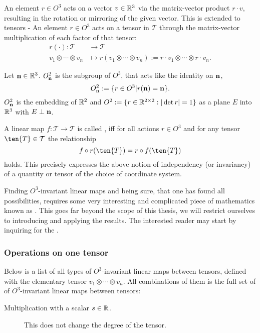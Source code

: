 {\begin{definition}
	An element $r\in O^3$ acts on a vector $v\in\mathbb{R}^3$ via the matrix-vector product $r\cdot v$, resulting in the rotation or mirroring of the given vector. This is extended to tensors - An element $r\in O^3$ acts on a tensor in $\mathcal{T}$ through the matrix-vector multiplication of each factor of that tensor:
	\begin{align*}
		r(\cdot):\mathcal{T} &\to \mathcal{T}\\
		v_1 \otimes \cdots \otimes v_n&\mapsto r(v_1 \otimes \cdots \otimes v_n) :=r\cdot v_1 \otimes \cdots \otimes r\cdot v_n.
	\end{align*}
\end{definition}

\begin{definition}
	Let $\mathbf{n}\in \mathbb{R}^3$. $O^2_{\mathbf{n}}$ is the subgroup of $O^3$, that acts like the identity on $\mathbf{n}$,  \[O^2_{\mathbf{n}}:=\{r\in O^3 | r(\mathbf{n}) = \mathbf{n} \}.\] 
	$O^2_{\mathbf{n}}$  is the embedding of $\mathbb{R}^2$ and $O^2:= \{r\in\mathbb{R}^{2\times 2}: |\det r| = 1\}$ as a plane $E$ into $\mathbb{R}^3$ with $E\perp\mathbf{n}$.
\end{definition}


\begin{definition}
	A linear map $f: \mathcal{T}\to \mathcal{T}$ is called , iff for all actions $r\in O^3$  and for any tensor $\ten{T}\in\mathcal{T}$ the relationship
	\[f \circ r (\ten{T}) = r \circ f (\ten{T})\]
	holds. This precisely expresses the above notion of independency (or invariancy) of a quantity or tensor of the choice of coordinate system.
\end{definition}
Finding $O^3$-invariant linear maps and being sure, that one has found all possibilities, requires some very interesting and complicated piece of mathematics known as . This goes far beyond the scope of this thesis, we will restrict ourselves to introducing and applying the results. The interested reader may start by inquiring for the . 

\subsubsection{Operations on one tensor}\label{chap:tensorOperations}
Below is a list of all types of $O^3$-invariant linear maps between tensors, defined with the elementary tensor $v_1 \otimes \cdots \otimes v_n$. All combinations of them is the full set of of $O^3$-invariant linear maps between tensors:
\begin{description}
	\item[Multiplication with a scalar $s\in\mathbb{R}$.] This does not change the degree of the tensor.
	

\end{description}}
